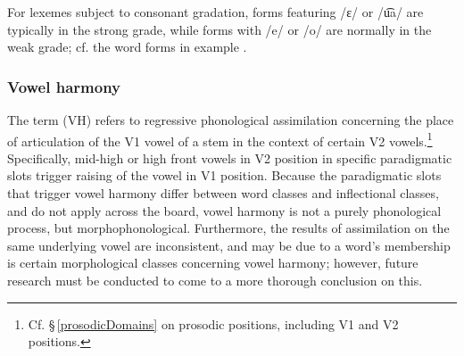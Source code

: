 \ea\label{umlautEx1}%
\z
%
\ea\label{umlautEx2}%
\Tn{\begin{tabular}{c c}
/p\Bf{u͡a}lːta/		&/p\Bf{o}lta/\\
\It{buallda}		&\It{buolda}\\
ignite\BS\Sc{3sg.prs}	&ignite\BS\Sc{2sg.prs}\\
\end{tabular}
\hfill\hyperlink{pit101208}{{\small [pit101208]}}}
\z
For lexemes subject to consonant gradation, forms featuring /ɛ/ or /u͡a/ are typically in the strong grade, while forms with /e/ or /o/ are normally in the weak grade; cf. the word forms in example . 


\subsubsection{Vowel harmony}\label{VH}
The term  (VH) refers to regressive phonological assimilation concerning the place of articulation of the V1 vowel of a stem in the context of certain V2 vowels.\footnote{Cf. §\,\ref{prosodicDomains} on prosodic positions, including V1 and V2 positions.} 
Specifically, mid-high or high front vowels in V2 position in specific paradigmatic slots trigger raising of the vowel in V1 position. Because the paradigmatic slots that trigger vowel harmony differ between word classes and inflectional classes, and do not apply across the board, vowel harmony is not a purely phonological process, but morphophonological. Furthermore, the results of assimilation on the same underlying vowel are inconsistent, and may be due to a word’s membership is certain morphological classes concerning vowel harmony; however, future research must be conducted to come to a more thorough conclusion on this. 

